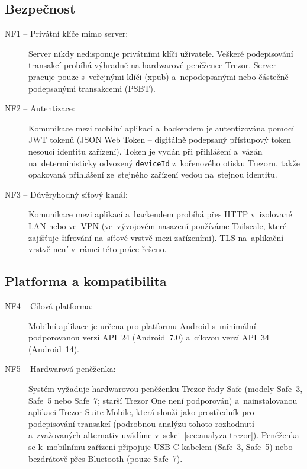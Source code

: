 \subsection{Bezpečnost}

\begin{description}
  \item[NF1 -- Privátní klíče mimo server:]
    Server nikdy nedisponuje privátními klíči uživatele. Veškeré podepisování
    transakcí probíhá výhradně na hardwarové peněžence Trezor. Server pracuje
    pouze s~veřejnými klíči (xpub) a~nepodepsanými nebo částečně podepsanými
    transakcemi (PSBT).

  \item[NF2 -- Autentizace:]
    Komunikace mezi mobilní aplikací a~backendem je autentizována pomocí
    JWT tokenů (JSON Web Token -- digitálně podepsaný přístupový token
    nesoucí identitu zařízení). Token je vydán při přihlášení a~vázán
    na~deterministicky odvozený \texttt{deviceId} z~kořenového otisku
    Trezoru, takže opakovaná přihlášení ze~stejného zařízení vedou
    na~stejnou identitu.

  \item[NF3 -- Důvěryhodný síťový kanál:]
    Komunikace mezi aplikací a~backendem probíhá přes HTTP v~izolované
    LAN nebo ve~VPN (ve~vývojovém nasazení používáme Tailscale, které
    zajišťuje šifrování na~síťové vrstvě mezi zařízeními). TLS
    na~aplikační vrstvě není v~rámci této práce řešeno.
\end{description}

\subsection{Platforma a kompatibilita}

\begin{description}
  \item[NF4 -- Cílová platforma:]
    Mobilní aplikace je určena pro platformu Android s~minimální podporovanou
    verzí API~24 (Android~7.0) a~cílovou verzí API~34 (Android~14).

  \item[NF5 -- Hardwarová peněženka:]
    Systém vyžaduje hardwarovou peněženku Trezor řady Safe (modely Safe~3,
    Safe~5 nebo Safe~7; starší Trezor One není podporován) a~nainstalovanou
    aplikaci Trezor Suite Mobile, která slouží jako prostředník pro
    podepisování transakcí (podrobnou analýzu tohoto rozhodnutí
    a~zvažovaných alternativ uvádíme v~sekci~\ref{sec:analyza-trezor}).
    Peněženka se k~mobilnímu zařízení připojuje USB-C kabelem
    (Safe~3, Safe~5) nebo bezdrátově přes Bluetooth (pouze Safe~7).
\end{description}

